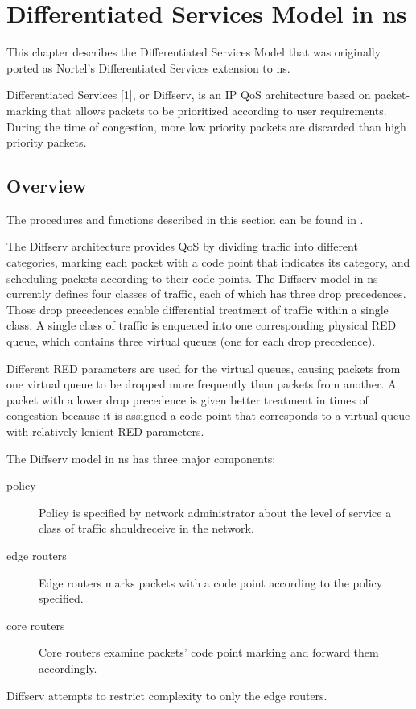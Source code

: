 %
%
\chapter{Differentiated Services Model in ns}
\label{chap:diffserv}

This chapter describes the Differentiated Services Model that was originally 
ported as Nortel's Differentiated Services extension to ns.

Differentiated Services [1], or Diffserv, is an IP QoS architecture based on 
packet-marking that allows packets to be prioritized according to user 
requirements.  During the time of congestion, more low priority packets are 
discarded than high priority packets.

\section{Overview}
\label{sec:diffservoverview}

The procedures and functions described in this section can be found in
.

The Diffserv architecture provides QoS by dividing traffic into different 
categories, marking each packet with a code point that indicates its category, 
and scheduling packets according to their code points. The Diffserv model in ns 
currently defines four classes of traffic, each of which has three drop 
precedences.  Those drop precedences enable differential treatment of traffic 
within a single class. A single class of traffic is enqueued into one 
corresponding physical RED queue, which contains three virtual queues (one for
each drop precedence).

Different RED parameters are used for the virtual queues, causing packets from 
one virtual queue to be dropped more frequently than packets from another.  A 
packet with a lower drop precedence is given better treatment in times of 
congestion because it is assigned a code point that corresponds to a virtual 
queue with relatively lenient RED parameters.  

The Diffserv model in ns has three major components:
\begin{description}

\item [policy]
Policy is specified by network administrator about the level of service a class
of traffic shouldreceive in the network.  

\item [edge routers]
Edge routers marks packets with a code point according to the policy specified.

\item [core routers]
Core routers examine packets' code point marking and forward them accordingly.

\end{description}
Diffserv attempts to restrict complexity to only the edge routers.


